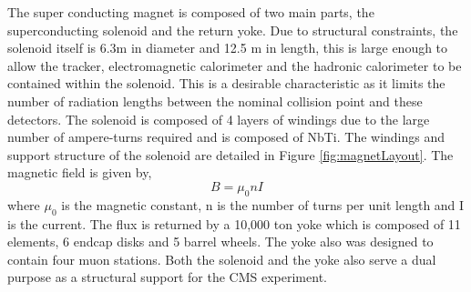The super conducting magnet is composed of two main parts, the superconducting
solenoid and the return yoke.
Due to structural constraints, the solenoid itself is 6.3m in diameter and 12.5 m in length,
this is large enough to allow the tracker, electromagnetic calorimeter
and the hadronic calorimeter to be contained within the solenoid. This is
a desirable characteristic as it limits the number of radiation
lengths between the nominal collision point and these detectors. The solenoid
is composed of 4 layers of windings due to the large number of ampere-turns required
and is composed of NbTi. The windings and support structure of the solenoid
are detailed in Figure \ref{fig:magnetLayout}. 
The magnetic field is given by,
\begin{displaymath}
B=\mu_{0}nI
\end{displaymath}
where $\mu_{0}$ is the magnetic constant, n is the number of turns per unit length and 
I is the current. 
The flux is returned by a 10,000 ton yoke which is composed of 11 elements, 6 endcap disks 
and 5 barrel wheels. The yoke also was designed to contain four muon stations. 
Both the solenoid and the yoke also serve a dual purpose as a structural support 
for the CMS experiment. 